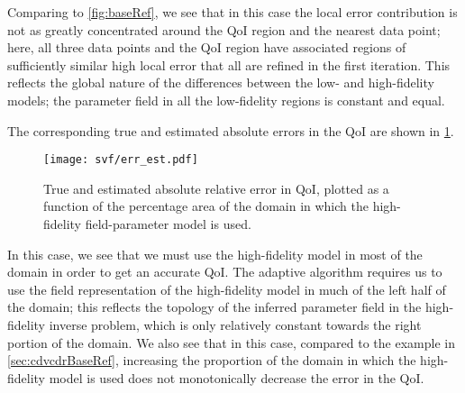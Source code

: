 %
Comparing to \cref{fig:baseRef}, we see that in this case the local error contribution is not as greatly concentrated around the QoI region and the nearest data point; here, all three data points and the QoI region have associated regions of sufficiently similar high local error that all are refined in the first iteration. This reflects the global nature of the differences between the low- and high-fidelity models; the parameter field in all the low-fidelity regions is constant and equal. 

The corresponding true and estimated absolute errors in the QoI are shown in \cref{fig:svfErr}.
%
\begin{figure}[htbp]
\centering
\texttt{[image: svf/err\_est.pdf]}
\caption{True and estimated absolute relative error in QoI, plotted as a function of the percentage area of the domain in which the high-fidelity field-parameter model is used.}
\label{fig:svfErr}
\end{figure}
%
In this case, we see that we must use the high-fidelity model in most of the domain in order to get an accurate QoI. The adaptive algorithm requires us to use the field representation of the high-fidelity model in much of the left half of the domain; this reflects the topology of the inferred parameter field in the high-fidelity inverse problem, which is only relatively constant towards the right portion of the domain. We also see that in this case, compared to the example in \cref{sec:cdvcdrBaseRef}, increasing the proportion of the domain in which the high-fidelity model is used does not monotonically decrease the error in the QoI. 
